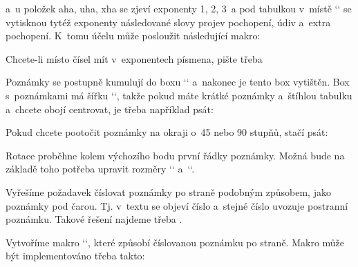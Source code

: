 {\begtt
{} 
\nobreak\medskip\tnotes 
\endtt


a~u položek aha, uha, xha se zjeví exponenty 1, 2, 3~a pod tabulkou v~místě `\tnotes` se vytisknou tytéž exponenty následované slovy projev pochopení, údiv a~extra pochopení. K~tomu účelu může posloužit následující makro: 

\begtt
\newcount\tnotenum  \newbox\tnotebox 
\def\tnote#1{\global\advance\tnotenum by1 
   \hbox{\thetnote}%
   \global\setbox\tnotebox=\vbox{\unvbox\tnotebox 
      \typobase\typoscale[800/800] \noindent\enspace\llap{\thetnote\ }#1\strut}} 
\def\tnotes{\global\tnotenum=0 \box\tnotebox} 
\def\thetnote{$^{\the\tnotenum}$} 
\endtt


Chcete-li místo čísel mít v~exponentech písmena, pište třeba 

\begtt
\def\thetnote{$^{\rm\athe{\the\tnotenum}}$} 
\endtt


Poznámky se postupně kumulují do boxu `\tnotebox` a~nakonec je tento box vytištěn. Box s~poznámkami má šířku `\hsize`, takže pokud máte krátké poznámky a~štíhlou tabulku a~chcete obojí centrovat, je třeba například psát: 

\begtt
\centerline{\vbox{\medskip\rlap{\tnotes}}} 
\endtt

 


Pokud chcete pootočit poznámky na okraji o~45 nebo 90 stupňů, stačí psát: 

\begtt
\fixmnotes\right 
\def\mnotehook#1\endgraf{\noindent\pdfsave{}\pdfrestore} 
\endtt


Rotace proběhne kolem výchozího bodu první řádky poznámky. Možná bude na základě toho potřeba upravit rozměry `\mnoteindent` a~`\mnotesize`. 


 


Vyřešíme požadavek číslovat poznámky po straně podobným způsobem, jako poznámky pod čarou. Tj. v~textu se objeví číslo a~stejné číslo uvozuje postranní poznámku. Takové řešení najdeme třeba . 



Vytvoříme makro ``, které způsobí číslovanou poznámku po straně. Makro může být implementováno třeba takto: 

}
